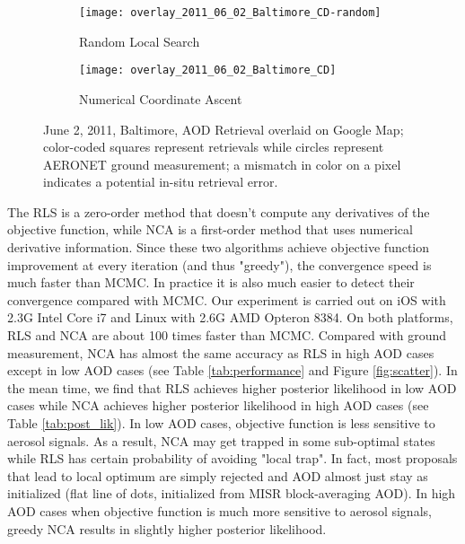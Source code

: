 \begin{figure}[h!]
    \centering
    \begin{subfigure}{\textwidth}
        \centering
        \texttt{[image: overlay\_2011\_06\_02\_Baltimore\_CD-random]}
        \caption{Random Local Search}
        \label{fig:aod_CD-random}
    \end{subfigure}
    \begin{subfigure}{\textwidth}
        \centering
        \texttt{[image: overlay\_2011\_06\_02\_Baltimore\_CD]}
        \caption{Numerical Coordinate Ascent}
        \label{fig:aod_CD}
    \end{subfigure}
    \caption{June 2, 2011, Baltimore, AOD Retrieval overlaid on Google Map;
        color-coded squares represent retrievals while circles represent AERONET ground measurement; a mismatch in color on a pixel indicates a potential in-situ retrieval error.}
    \label{fig:aod}
\end{figure}

The RLS is a zero-order method that doesn't compute any derivatives of the objective function, while NCA is a first-order method that uses numerical derivative information. Since these two algorithms achieve objective function improvement at every iteration (and thus "greedy"), the convergence speed is much faster than MCMC. In practice it is also much easier to detect their convergence compared with MCMC. Our experiment is carried out on iOS with 2.3G Intel Core i7 and Linux with 2.6G AMD Opteron 8384. On both platforms, RLS and NCA are about 100 times faster than MCMC. Compared with ground measurement, NCA has almost the same accuracy as RLS in high AOD cases except in low AOD cases (see Table \ref{tab:performance} and Figure \ref{fig:scatter}). In the mean time, we find that RLS achieves higher posterior likelihood in low AOD cases while NCA achieves higher posterior likelihood in high AOD cases (see Table \ref{tab:post_lik}). In low AOD cases, objective function is less sensitive to aerosol signals. As a result, NCA may get trapped in some sub-optimal states while RLS has certain probability of avoiding "local trap". In fact, most proposals that lead to local optimum are simply rejected and AOD almost just stay as initialized (flat line of dots, initialized from MISR block-averaging AOD). In high AOD cases when objective function is much more sensitive to aerosol signals, greedy NCA results in slightly higher posterior likelihood.

